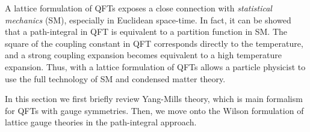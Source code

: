 A lattice formulation of QFTs exposes a close connection with \emph{statistical mechanics} (SM), especially in Euclidean space-time.
In fact, it can be showed that a path-integral in QFT is equivalent to a partition function in SM.
The square of the coupling constant in QFT corresponds directly to the temperature, and a strong coupling expansion becomes equivalent to a high temperature expansion.
Thus, with a lattice formulation of QFTs allows a particle physicist to use the full technology of SM and condensed matter theory.


\medskip

In this section we first briefly review Yang-Mills theory, which is main formalism for QFTs with gauge symmetries.
Then, we move onto the Wilson formulation of lattice gauge theories in the path-integral approach.





